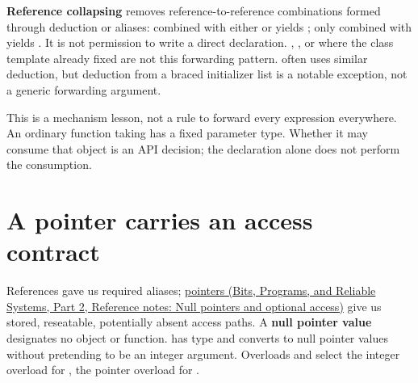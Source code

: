 \textbf{Reference collapsing} removes reference-to-reference combinations formed through deduction or aliases: \BookInlineCode{{\&}}{\&} combined with either \BookInlineCode{{\&}}{\&} or \BookInlineCode{{\&}{\&}}{\&\&} yields \BookInlineCode{{\&}}{\&}; only \BookInlineCode{{\&}{\&}}{\&\&} combined with \BookInlineCode{{\&}{\&}}{\&\&} yields \BookInlineCode{{\&}{\&}}{\&\&}. It is not permission to write a direct  declaration. , , or  where the class template already fixed  are not this forwarding pattern.  often uses similar deduction, but deduction from a braced initializer list is a notable exception, not a generic forwarding argument.

This is a mechanism lesson, not a rule to forward every expression everywhere. An ordinary function taking  has a fixed parameter type. Whether it may consume that object is an API decision; the declaration alone does not perform the consumption.

\section{A pointer carries an access contract}\label{05-engine-i-ch003-a-pointer-carries-an-access-contract}

\hypertarget{05-engine-i-ch003-a-pointer-carries-an-access-contract}{}

References gave us required aliases; \href{../01-Bits-Programs-and-Reliable-Systems-P02/main.pdf\#appendix-afae48c31800}{pointers (Bits, Programs, and Reliable Systems, Part 2, Reference notes: Null pointers and optional access)} give us stored, reseatable, potentially absent access paths. A \textbf{null pointer value} designates no object or function.  has type  and converts to null pointer values without pretending to be an integer argument. Overloads  and  select the integer overload for , the pointer overload for .

